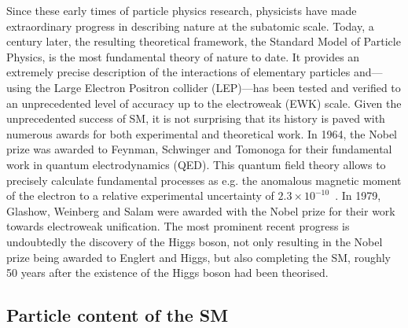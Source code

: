 Since these early times of particle physics research, physicists have made extraordinary progress in describing nature at the subatomic scale. Today, a century later, the resulting theoretical framework, the Standard Model of Particle Physics, is the most fundamental theory of nature to date. It provides an extremely precise description of the interactions of elementary particles and---using the Large Electron Positron collider (LEP)---has been tested and verified to an unprecedented level of accuracy up to the electroweak (EWK) scale. Given the unprecedented success of SM, it is not surprising that its history is paved with numerous awards for both experimental and theoretical work. In 1964, the Nobel prize was awarded to Feynman, Schwinger and Tomonoga for their fundamental work in quantum electrodynamics (QED). This quantum field theory allows to precisely calculate fundamental processes as e.g. the anomalous magnetic moment of the electron to a relative experimental uncertainty of $2.3 \times 10^{-10}$~\cite{Mohr:2015ccw}. In 1979, Glashow, Weinberg and Salam were awarded with the Nobel prize for their work towards electroweak unification. The most prominent recent progress is undoubtedly the discovery of the Higgs boson, not only resulting in the Nobel prize being awarded to Englert and Higgs, but also completing the SM, roughly 50 years after the existence of the Higgs boson had been theorised. 

		
\subsection{Particle content of the SM}

